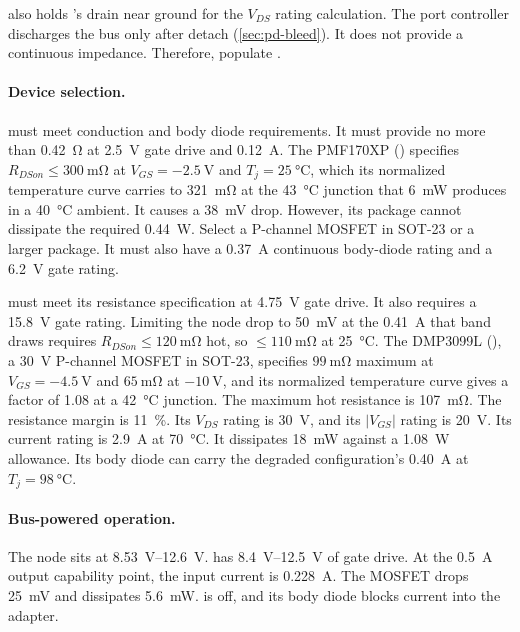  also holds 's drain near ground for the
$V_{DS}$ rating calculation. The port controller discharges the bus only after
detach (\cref{sec:pd-bleed}). It does not provide a continuous impedance.
Therefore, populate .

\paragraph{Device selection.}  must meet conduction and body
diode requirements. It must provide no more than \SI{0.42}{\ohm} at
\SI{2.5}{\volt} gate drive and \SI{0.12}{\ampere}. The PMF170XP
()
specifies $R_{DSon} \leq \SI{300}{\milli\ohm}$ at $V_{GS} = -\SI{2.5}{\volt}$
and $T_j = \SI{25}{\celsius}$, which its normalized temperature curve carries to
\SI{321}{\milli\ohm} at the \SI{43}{\celsius} junction that \SI{6}{\milli\watt}
produces in a \SI{40}{\celsius} ambient. It causes a
\SI{38}{\milli\volt} drop. However, its package cannot dissipate the required
\SI{0.44}{\watt}. Select a P-channel MOSFET in SOT-23 or a larger package. It
must also have a \SI{0.37}{\ampere} continuous body-diode rating and a
\SI{6.2}{\volt} gate rating.

 must meet its resistance specification at
\SI{4.75}{\volt} gate drive. It also requires a \SI{15.8}{\volt} gate rating.
Limiting the node drop to \SI{50}{\milli\volt} at the
\SI{0.41}{\ampere} that band draws requires $R_{DSon}\leq\SI{120}{\milli\ohm}$
hot, so $\leq\SI{110}{\milli\ohm}$ at \SI{25}{\celsius}. The DMP3099L
(), a \SI{30}{\volt} P-channel MOSFET in SOT-23, specifies
$\SI{99}{\milli\ohm}$ maximum at $V_{GS} = -\SI{4.5}{\volt}$ and
$\SI{65}{\milli\ohm}$ at $-\SI{10}{\volt}$, and its normalized temperature curve
gives a factor of 1.08 at a \SI{42}{\celsius} junction. The maximum hot
resistance is \SI{107}{\milli\ohm}. The resistance margin is
\SI{11}{\percent}. Its $V_{DS}$ rating is \SI{30}{\volt}, and its $|V_{GS}|$
rating is \SI{20}{\volt}. Its current rating is \SI{2.9}{\ampere} at
\SI{70}{\celsius}. It dissipates \SI{18}{\milli\watt} against a
\SI{1.08}{\watt} allowance. Its body diode can carry the degraded
configuration's \SI{0.40}{\ampere} at $T_j=\SI{98}{\celsius}$.

\paragraph{Bus-powered operation.} The node sits at
\SIrange{8.53}{12.6}{\volt}.  has
\SIrange{8.4}{12.5}{\volt} of gate drive. At the \SI{0.5}{\ampere} output
capability point, the input current is \SI{0.228}{\ampere}. The MOSFET drops
\SI{25}{\milli\volt} and dissipates \SI{5.6}{\milli\watt}.
 is off, and its body diode blocks current
into the adapter.

